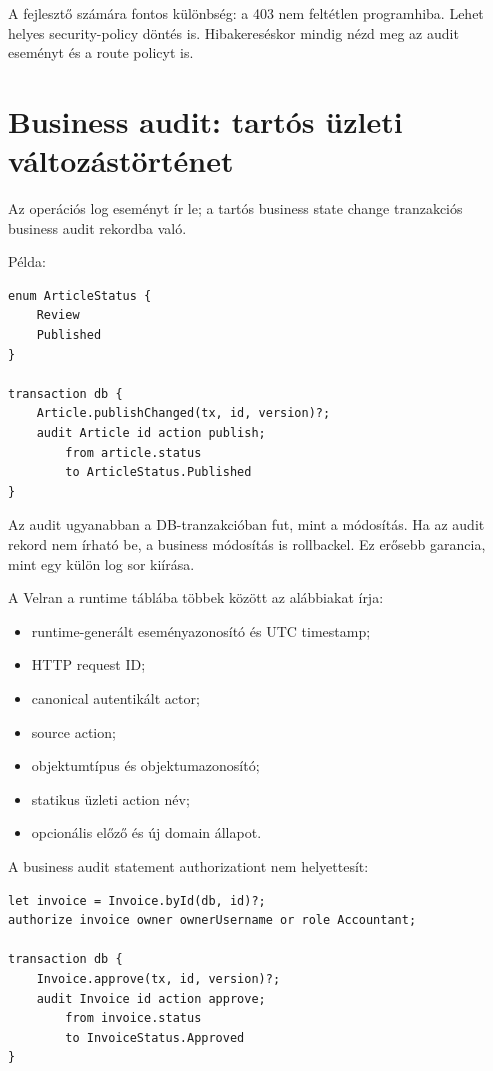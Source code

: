 A fejlesztő számára fontos különbség: a 403 nem feltétlen programhiba. Lehet helyes security-policy döntés is. Hibakereséskor mindig nézd meg az audit eseményt és a route policyt is.

\section{Business audit: tartós üzleti változástörténet}

Az operációs log eseményt ír le; a tartós business state change tranzakciós business audit rekordba való.

Példa:

\begin{lstlisting}[language=Velran]
enum ArticleStatus {
    Review
    Published
}

transaction db {
    Article.publishChanged(tx, id, version)?;
    audit Article id action publish;
        from article.status
        to ArticleStatus.Published
}
\end{lstlisting}

Az audit ugyanabban a DB-tranzakcióban fut, mint a módosítás. Ha az audit rekord nem írható be, a business módosítás is rollbackel. Ez erősebb garancia, mint egy külön log sor kiírása.

A Velran a  runtime táblába többek között az alábbiakat írja:

\begin{itemize}
  \item runtime-generált eseményazonosító és UTC timestamp;
  \item HTTP request ID;
  \item canonical autentikált actor;
  \item source action;
  \item objektumtípus és objektumazonosító;
  \item statikus üzleti action név;
  \item opcionális előző és új domain állapot.
\end{itemize}

\Needspace{0.30\textheight}
A business audit statement authorizationt nem helyettesít:

\begin{lstlisting}[language=Velran]
let invoice = Invoice.byId(db, id)?;
authorize invoice owner ownerUsername or role Accountant;

transaction db {
    Invoice.approve(tx, id, version)?;
    audit Invoice id action approve;
        from invoice.status
        to InvoiceStatus.Approved
}
\end{lstlisting}

